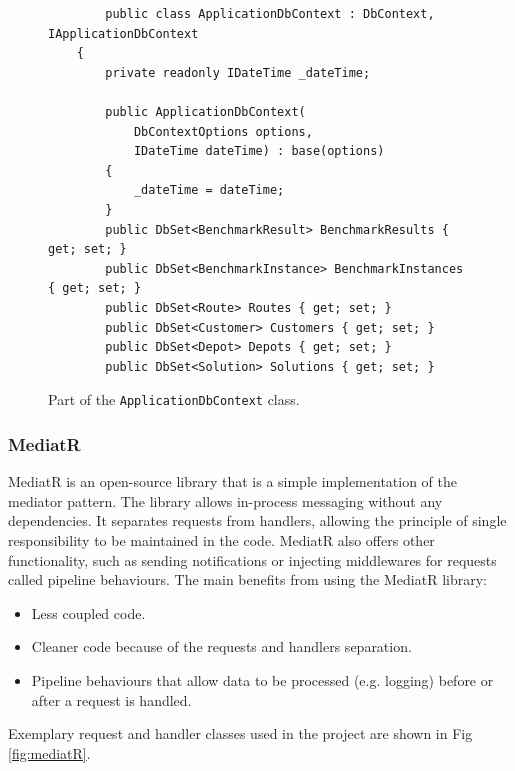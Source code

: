 \documentclass[a4paper,twoside,12pt]{book}
\begin{document}
\begin{figure}
\centering
\begin{lstlisting}
        public class ApplicationDbContext : DbContext, IApplicationDbContext
    {
        private readonly IDateTime _dateTime;

        public ApplicationDbContext(
            DbContextOptions options,
            IDateTime dateTime) : base(options)
        {
            _dateTime = dateTime;
        }
        public DbSet<BenchmarkResult> BenchmarkResults { get; set; }
        public DbSet<BenchmarkInstance> BenchmarkInstances { get; set; }
        public DbSet<Route> Routes { get; set; }
        public DbSet<Customer> Customers { get; set; }
        public DbSet<Depot> Depots { get; set; }
        public DbSet<Solution> Solutions { get; set; }
\end{lstlisting}
\caption{Part of the \lstinline|ApplicationDbContext| class.}
\label{fig:context}
\end{figure}

\subsubsection{MediatR}
MediatR is an open-source library that is a simple implementation of the mediator pattern. The library allows in-process messaging without any dependencies. It separates requests from handlers, allowing the principle of single responsibility to be maintained in the code.
MediatR also offers other functionality, such as sending notifications or injecting middlewares for requests called pipeline behaviours.
The main benefits from using the MediatR library: 
\begin{itemize}
\item Less coupled code.
\item Cleaner code because of the requests and handlers separation.
\item Pipeline behaviours that allow data to be processed (e.g. logging) before or after a request is handled.
\end{itemize}

Exemplary request and handler classes used in the project are shown in Fig \ref{fig:mediatR}.
\end{document}
